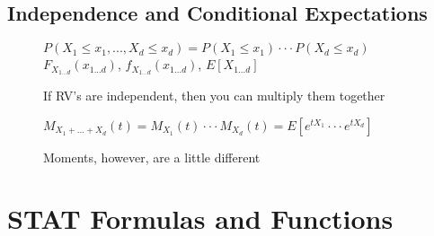 \documentclass[10pt]{report}
\begin{document}
\chapter{Independence and Conditional Expectations}
\begin{figure}[h]
$P(X_{1} \leq x_{1}, ..., X_{d} \leq x_{d}) = P(X_{1} \leq x_{1}) \cdot \cdot \cdot P(X_{d} \leq x_{d})$\\
$F_{X_{1...d}}(x_{1...d})$, $f_{X_{1...d}}(x_{1...d})$, $E\left[X_{1...d}\right]$
\caption{If RV's are independent, then you can multiply them together}
\end{figure}
\begin{figure}[h]
$M_{X_{1} + ... + X_{d}}(t) = M_{X_{1}}(t) \cdot\cdot\cdot M_{X_{d}}(t) = E\left[e^{tX_{1}} \cdot\cdot\cdot e^{tX_{d}}\right]$
\caption{Moments, however, are a little different}
\end{figure}

\part{STAT Formulas and Functions}
\end{document}
